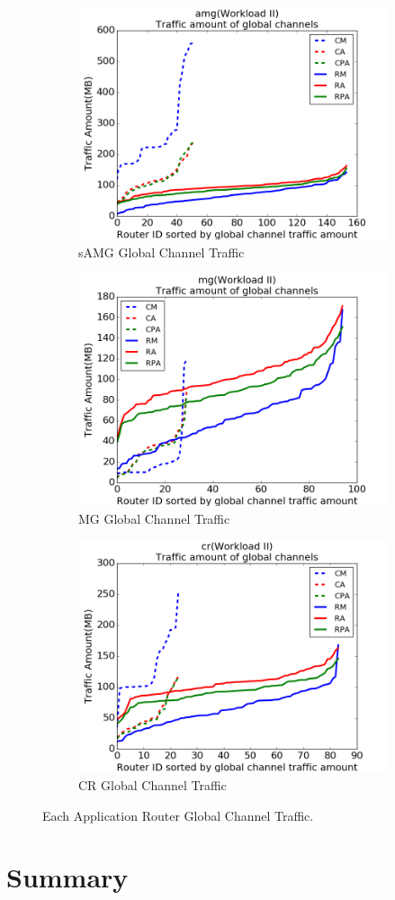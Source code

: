 \documentclass[conference,compsoc]{IEEEtran}
\begin{document}
\begin{figure}[t!]
    \centering
    \begin{subfigure}[t]{0.32\textwidth}
        \centering
        \includegraphics[height=1.5 in]{syn-wkld/amg10/gc-traffic}
        \caption{sAMG Global Channel Traffic}
        \label{fig:syn-samg-gc-traffic}
    \end{subfigure}%
    \hspace{1em}%
    \begin{subfigure}[t]{0.32\textwidth}
        \centering
        \includegraphics[height=1.5 in]{syn-wkld/mg/gc-traffic}
        \caption{MG Global Channel Traffic}
        \label{fig:syn-mg-gc-traffic}
    \end{subfigure}%
    \begin{subfigure}[t]{0.32\textwidth}
        \centering
        \includegraphics[height=1.5 in]{syn-wkld/cr/gc-traffic}
        \caption{CR Global Channel Traffic}
        \label{fig:syn-cr-gc-traffic}
    \end{subfigure}%
   \caption{Each Application Router Global Channel Traffic.}
   \label{fig:syn-3app-gc-traffic}
\end{figure}




\section{Summary}
\end{document}
